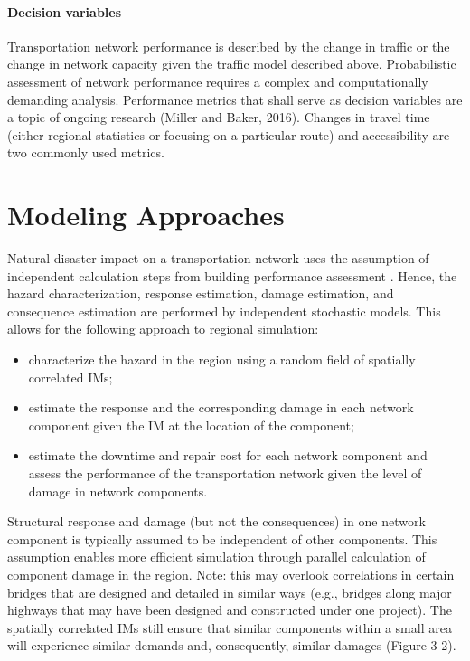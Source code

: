 \paragraph{Decision variables} Transportation network performance is described by the change in traffic or the change in network capacity given the traffic model described above. Probabilistic assessment of network performance requires a complex and computationally demanding analysis. Performance metrics that shall serve as decision variables are a topic of ongoing research (Miller and Baker, 2016). Changes in travel time (either regional statistics or focusing on a particular route) and accessibility are two commonly used metrics.

\section{Modeling Approaches}
\label{sec:perf_transport_methods}

Natural disaster impact on a transportation network uses the assumption of independent calculation steps from building performance assessment \citep{Change et al., 2000, kiremidjian2006pacific}. Hence, the hazard characterization, response estimation, damage estimation, and consequence estimation are performed by independent stochastic models. This allows for the following approach to regional simulation:

\begin{itemize}
    \item characterize the hazard in the region using a random field of spatially correlated IMs;
    \item estimate the response and the corresponding damage in each network component given the IM at the location of the component;
    \item estimate the downtime and repair cost for each network component and assess the performance of the transportation network given the level of damage in network components.
\end{itemize}

Structural response and damage (but not the consequences) in one network component is typically assumed to be independent of other components. This assumption enables more efficient simulation through parallel calculation of component damage in the region. Note: this may overlook correlations in certain bridges that are designed and detailed in similar ways (e.g., bridges along major highways that may have been designed and constructed under one project). The spatially correlated IMs still ensure that similar components within a small area will experience similar demands and, consequently, similar damages (Figure 3 2).

